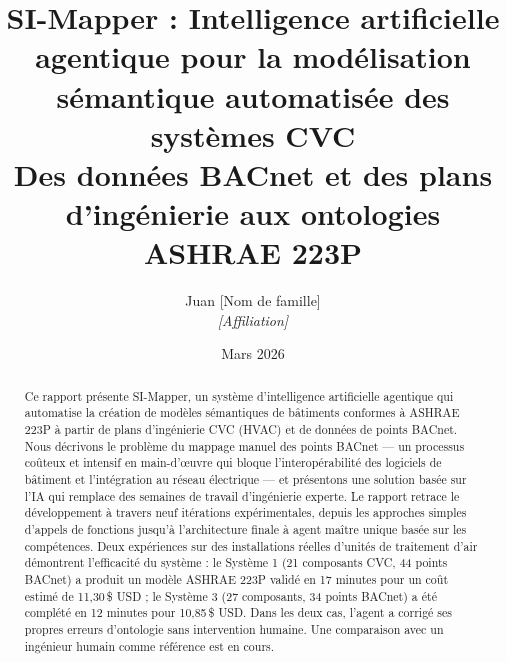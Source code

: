 \documentclass[11pt, a4paper]{article}
\title{SI-Mapper : Intelligence artificielle agentique pour la modélisation sémantique automatisée des systèmes CVC\\[0.5em]
\large Des données BACnet et des plans d'ingénierie aux ontologies ASHRAE 223P}
\author{Juan [Nom de famille] \\ \textit{[Affiliation]}}
\date{Mars 2026}
\begin{document}
\maketitle

\begin{abstract}
Ce rapport présente SI-Mapper, un système d'intelligence artificielle agentique qui automatise la création de modèles sémantiques de bâtiments conformes à ASHRAE 223P à partir de plans d'ingénierie CVC (HVAC) et de données de points BACnet. Nous décrivons le problème du mappage manuel des points BACnet --- un processus coûteux et intensif en main-d'œuvre qui bloque l'interopérabilité des logiciels de bâtiment et l'intégration au réseau électrique --- et présentons une solution basée sur l'IA qui remplace des semaines de travail d'ingénierie experte. Le rapport retrace le développement à travers neuf itérations expérimentales, depuis les approches simples d'appels de fonctions jusqu'à l'architecture finale à agent maître unique basée sur les compétences. Deux expériences sur des installations réelles d'unités de traitement d'air démontrent l'efficacité du système : le Système 1 (21 composants CVC, 44 points BACnet) a produit un modèle ASHRAE 223P validé en 17 minutes pour un coût estimé de 11,30\,\$ USD ; le Système 3 (27 composants, 34 points BACnet) a été complété en 12 minutes pour 10,85\,\$ USD. Dans les deux cas, l'agent a corrigé ses propres erreurs d'ontologie sans intervention humaine. Une comparaison avec un ingénieur humain comme référence est en cours.
\end{abstract}

\tableofcontents
\newpage









\end{document}
